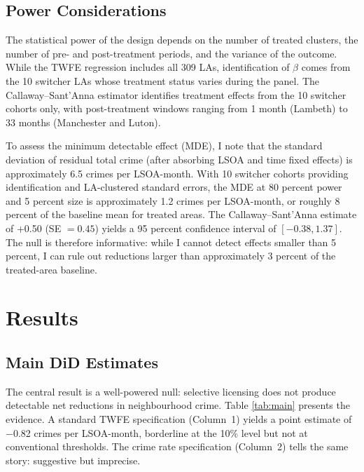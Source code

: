 \documentclass[12pt]{article}
\begin{document}
\subsection{Power Considerations}

The statistical power of the design depends on the number of treated clusters, the number of pre- and post-treatment periods, and the variance of the outcome. While the TWFE regression includes all 309 LAs, identification of $\beta$ comes from the 10 switcher LAs whose treatment status varies during the panel. The Callaway--Sant'Anna estimator identifies treatment effects from the 10 switcher cohorts only, with post-treatment windows ranging from 1 month (Lambeth) to 33 months (Manchester and Luton).

To assess the minimum detectable effect (MDE), I note that the standard deviation of residual total crime (after absorbing LSOA and time fixed effects) is approximately 6.5 crimes per LSOA-month. With 10 switcher cohorts providing identification and LA-clustered standard errors, the MDE at 80 percent power and 5 percent size is approximately 1.2 crimes per LSOA-month, or roughly 8 percent of the baseline mean for treated areas. The Callaway--Sant'Anna estimate of $+$0.50 (SE $= 0.45$) yields a 95 percent confidence interval of $[-0.38, 1.37]$. The null is therefore informative: while I cannot detect effects smaller than 5 percent, I can rule out reductions larger than approximately 3 percent of the treated-area baseline.


\section{Results}

\subsection{Main DiD Estimates}



The central result is a well-powered null: selective licensing does not produce detectable net reductions in neighbourhood crime. Table \ref{tab:main} presents the evidence. A standard TWFE specification (Column~1) yields a point estimate of $-$0.82 crimes per LSOA-month, borderline at the 10\% level but not at conventional thresholds. The crime rate specification (Column~2) tells the same story: suggestive but imprecise.
\end{document}
